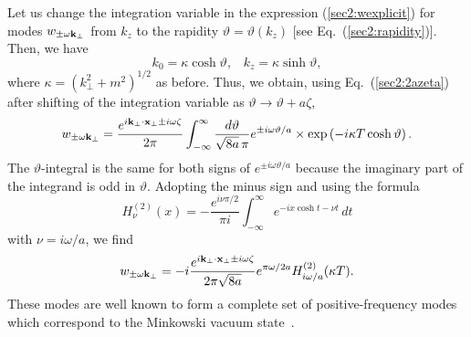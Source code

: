 \documentclass[12pt,nofootinbib,floatfix,aps,prd,showpacs,amsmath,amssymb,eqsecnum]{revtex4-2}
\begin{document}
Let us change the integration variable in the expression
(\ref{sec2:wexplicit}) for modes $w_{\pm \omega {\bf k}_\perp}$
from $k_z$ to the rapidity $\vartheta = \vartheta(k_z)$ 
[see Eq.~(\ref{sec2:rapidity})].
Then, we have
\begin{equation}
k_0  =  \kappa\cosh \vartheta,\;\;\;
k_z  =  \kappa\sinh \vartheta,
\end{equation}
where $\kappa = (k_\perp^2 + m^2)^{1/2}$ as before.
Thus, we obtain, using Eq.~(\ref{sec2:2azeta}) 
after shifting of the integration variable as $\vartheta \to \vartheta +
a\zeta$,
\begin{equation}
w_{\pm\omega{\bf k}_\bot} = \frac{e^{i{\bf k}_\bot\cdot{\bf x}_\bot \pm i\omega\zeta}}{2\pi}
\int_{-\infty}^\infty \frac{d\vartheta}{\sqrt{8a}\,\pi}
e^{\pm i \omega \vartheta/a}
\times
\exp\left( - i\kappa T\cosh\vartheta \right).
\end{equation}
The $\vartheta$-integral is the same for both signs of 
$e^{\pm i\omega\vartheta/a}$ 
because the imaginary part of the integrand is odd in
$\vartheta$.  Adopting the minus sign and using the
formula~\cite{Gradshteynbook}
\begin{equation}
H_\nu^{(2)}(x) = - \frac{e^{i\nu\pi/2}}{\pi i}
\int_{-\infty}^\infty e^{-ix\cosh t - \nu t}\, dt
\end{equation}
with $\nu = i\omega/a$, we find
\begin{equation}
w_{\pm\omega{\bf k}_\bot} =
-i \frac{e^{i{\bf k}_\bot\cdot{\bf x}_\bot 
\pm i\omega\zeta}}{2\pi\sqrt{8a}}e^{\pi\omega/2a}
H_{i\omega/a}^{(2)}(\kappa T).
\end{equation}
These modes are well known to form a complete set of positive-frequency
modes which correspond to the Minkowski vacuum
state~\cite{Fullingetal74}.
\end{document}
